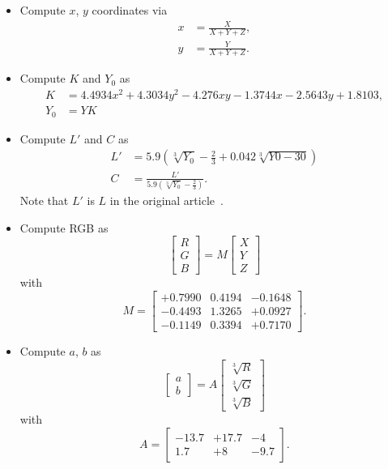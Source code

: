 \documentclass{scrartcl}
\theoremstyle{named}
\begin{document}
\begin{itemize}
  \item Compute $x$, $y$ coordinates via
    \[
      \begin{split}
        x &= \frac{X}{X + Y + Z},\\
        y &= \frac{Y}{X + Y + Z}.
      \end{split}
    \]
  \item Compute $K$ and $Y_0$ as
    \[
      \begin{split}
        K &= 4.4934 x^2 + 4.3034 y^2 - 4.276 x y - 1.3744 x - 2.5643 y + 1.8103,\\
        Y_0 &= Y K
      \end{split}
    \]

  \item Compute $L'$ and $C$ as
    \[
      \begin{split}
        L' &= 5.9 \left(\sqrt[3]{Y_0} - \frac{2}{3} + 0.042 \sqrt[3]{Y0 - 30}\right)\\
        C &= \frac{L'}{5.9 (\sqrt[3]{Y_0} - \frac{2}{3})}.
      \end{split}
    \]
    Note that $L'$ is $L$ in the original article~\cite{macadam}.

  \item Compute RGB as
    \[
      \begin{bmatrix}
        R\\
        G\\
        B
      \end{bmatrix}
      =
      M
      \begin{bmatrix}
        X\\
        Y\\
        Z
      \end{bmatrix}
    \]
    with
    \[
      M=\begin{bmatrix}
        +0.7990 & 0.4194 & -0.1648\\
        -0.4493 & 1.3265 & +0.0927\\
        -0.1149 & 0.3394 & +0.7170
      \end{bmatrix}.
    \]

  \item Compute $a$, $b$ as
    \[
      \begin{bmatrix}
        a\\
        b
      \end{bmatrix}
      =
      A
      \begin{bmatrix}
        \sqrt[3]{R}\\
        \sqrt[3]{G}\\
        \sqrt[3]{B}
      \end{bmatrix}
    \]
    with
    \[
      A = \begin{bmatrix}
        -13.7 & +17.7 & -4\\
        1.7 & +8 & -9.7
      \end{bmatrix}.
    \]


\end{itemize}
\end{document}
